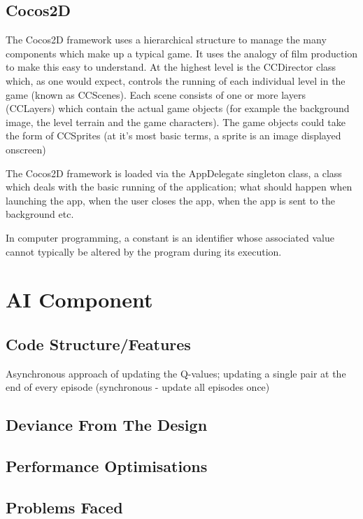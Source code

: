 \documentclass[a4paper,oneside]{report}
\begin{document}
\section{Cocos2D} The Cocos2D framework uses a hierarchical structure to manage the many components which make up a typical game. It uses the analogy of film production to make this easy to understand. At the highest level is the CCDirector class which, as one would expect, controls the running of each individual level in the game (known as CCScenes). Each scene consists of one or more  layers (CCLayers) which contain the actual game objects (for example the background image, the level terrain and the game characters). The game objects could take the form of CCSprites (at it's most basic terms, a sprite is an image displayed onscreen)

The Cocos2D framework is loaded via the AppDelegate singleton class, a class which deals with the basic running of the application; what should happen when launching the app, when the user closes the app, when the app is sent to the background etc.

In computer programming, a constant is an identifier whose associated value cannot typically be altered by the program during its execution.

\chapter{AI Component}

\section{Code Structure/Features}

Asynchronous approach of updating the Q-values; updating a single pair at the end of every episode (synchronous - update all episodes once)

\section{Deviance From The Design}
	
\section{Performance Optimisations}

\section{Problems Faced}
	
\end{document}
